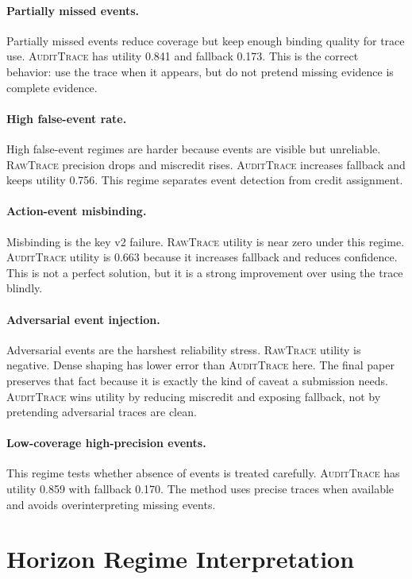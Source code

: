 \documentclass{article}
\newcommand{\method}{\textsc{AuditTrace}\xspace}
\newcommand{\rawtrace}{\textsc{RawTrace}\xspace}
\begin{document}
\paragraph{Partially missed events.}
Partially missed events reduce coverage but keep enough binding quality for trace use. \method has utility 0.841 and fallback 0.173. This is the correct behavior: use the trace when it appears, but do not pretend missing evidence is complete evidence.

\paragraph{High false-event rate.}
High false-event regimes are harder because events are visible but unreliable. \rawtrace precision drops and miscredit rises. \method increases fallback and keeps utility 0.756. This regime separates event detection from credit assignment.

\paragraph{Action-event misbinding.}
Misbinding is the key v2 failure. \rawtrace utility is near zero under this regime. \method utility is 0.663 because it increases fallback and reduces confidence. This is not a perfect solution, but it is a strong improvement over using the trace blindly.

\paragraph{Adversarial event injection.}
Adversarial events are the harshest reliability stress. \rawtrace utility is negative. Dense shaping has lower error than \method here. The final paper preserves that fact because it is exactly the kind of caveat a submission needs. \method wins utility by reducing miscredit and exposing fallback, not by pretending adversarial traces are clean.

\paragraph{Low-coverage high-precision events.}
This regime tests whether absence of events is treated carefully. \method has utility 0.859 with fallback 0.170. The method uses precise traces when available and avoids overinterpreting missing events.

\section{Horizon Regime Interpretation}
\end{document}
